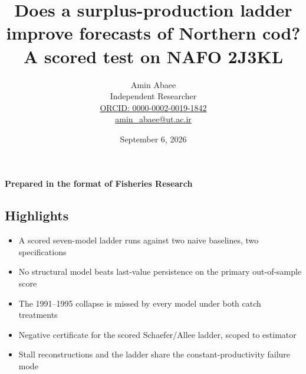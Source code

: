 \documentclass[11pt]{article}
\providecommand{\tightlist}{\setlength{\itemsep}{0pt}\setlength{\parskip}{0pt}}
\begin{document}
\title{Does a surplus-production ladder improve forecasts of Northern cod? A scored test on NAFO 2J3KL}
\author{Amin Abaee\\[0.35em]
{\small Independent Researcher}\\[0.55em]
{\small\href{https://orcid.org/0000-0002-0019-1842}{ORCID: 0000-0002-0019-1842}}\\[0.3em]
{\small\href{mailto:amin\_abaee@ut.ac.ir}{amin\_abaee@ut.ac.ir}}}
\date{September 6, 2026}
\maketitle

{\centering\small \textbf{Prepared in the format of Fisheries Research}\par}

\subsection{Highlights}\label{highlights}

\begin{itemize}
\tightlist
\item
  A scored seven-model ladder runs against two naive baselines, two
  specifications
\item
  No structural model beats last-value persistence on the primary
  out-of-sample score
\item
  The 1991--1995 collapse is missed by every model under both catch
  treatments
\item
  Negative certificate for the scored Schaefer/Allee ladder, scoped to
  estimator
\item
  Stall reconstructions and the ladder share the constant-productivity
  failure mode
\end{itemize}
\end{document}
